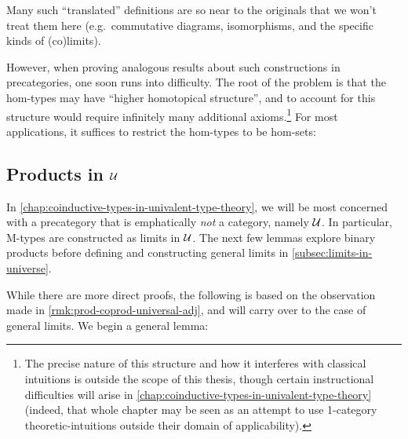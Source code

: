 \documentclass[12pt,twoside]{reedthesis}
\let\oldindex\index
\renewcommand{\index}[1]
               {\oldindex{#1}\marginpar{\footnotesize\color{index}index: #1}}
\newcommand{\unimathname}[1]{\texttt{\footnotesize\color{accepted} #1}}
\newcommand{\define}[1]{\textbf{#1}} %
\begin{document}
Many such ``translated'' definitions are so near to the originals that we won't
treat them here (e.g.\ commutative diagrams, isomorphisms, and the specific
kinds of (co)limits).

However, when proving analogous results about such constructions in
precategories, one soon runs into difficulty. The
root of the problem is that the hom-types may have ``higher homotopical
structure'', and to account for this structure would require infinitely many
additional axioms.\footnote{The precise nature of this structure and how it
  interferes with classical intuitions is outside the scope of this thesis,
  though certain instructional difficulties will arise in
  \cref{chap:coinductive-types-in-univalent-type-theory} (indeed, that whole
  chapter may be seen as an attempt to use 1-category theoretic-intuitions
  outside their domain of applicability).} For most applications, it suffices 
to restrict the hom-types to be hom-sets:

\subsection{Products in $\mathcal{U}$}
\label{subsec:products-in-universe}

In \cref{chap:coinductive-types-in-univalent-type-theory}, we will be most
concerned with a precategory that is emphatically \textit{not} a category,
namely $\mathcal{U}$. In particular, M-types are constructed as limits
in $\mathcal{U}$. The next few lemmas explore binary products before defining and
constructing general limits in \cref{subsec:limits-in-universe}.


While there are more direct proofs, the following is based on the
observation made in \cref{rmk:prod-coprod-universal-adj}, and will carry over to
the case of general limits. We begin a general lemma:
\end{document}
